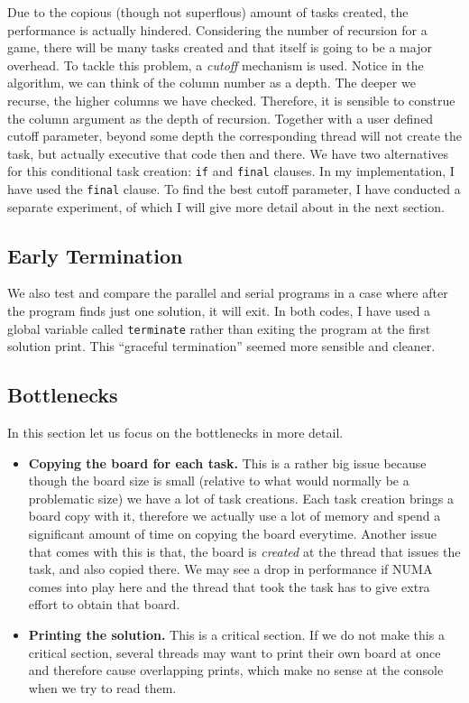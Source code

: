 \documentclass[11pt,reqno]{amsart}
\newcommand{\code}[1]{\texttt{#1}}
\begin{document}
Due to the copious (though not superflous) amount of tasks created, the performance is actually hindered. Considering the number of recursion for a game, there will be many tasks created and that itself is going to be a major overhead. To tackle this problem, a \textit{cutoff} mechanism is used. Notice in the algorithm, we can think of the column number as a depth. The deeper we recurse, the higher columns we have checked. Therefore, it is sensible to construe the column argument as the depth of recursion. Together with a user defined cutoff parameter, beyond some depth the corresponding thread will not create the task, but actually executive that code then and there. We have two alternatives for this conditional task creation: \code{if} and \code{final} clauses. In my implementation, I have used the \code{final} clause. To find the best cutoff parameter, I have conducted a separate experiment, of which I will give more detail about in the next section.

\subsection{Early Termination}

We also test and compare the parallel and serial programs in a case where after the program finds just one solution, it will exit. In both codes, I have used a global variable called \code{terminate} rather than exiting the program at the first solution print. This ``graceful termination'' seemed more sensible and cleaner.

\subsection{Bottlenecks}

In this section let us focus on the bottlenecks in more detail. 
\begin{itemize}
	\item \textbf{Copying the board for each task.} This is a rather big issue because though the board size is small (relative to what would normally be a problematic size) we have a lot of task creations. Each task creation brings a board copy with it, therefore we actually use a lot of memory and spend a significant amount of time on copying the board everytime. Another issue that comes with this is that, the board is \textit{created} at the thread that issues the task, and also copied there. We may see a drop in performance if NUMA comes into play here and the thread that took the task has to give extra effort to obtain that board.
	\item \textbf{Printing the solution.} This is a critical section. If we do not make this a critical section, several threads may want to print their own board at once and therefore cause overlapping prints, which make no sense at the console when we try to read them.
\end{itemize}
\end{document}
